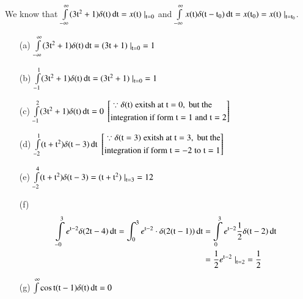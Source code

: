 \begin{solution}
We know that $\int\limits_{-\infty}^{\infty}(3\textrm{t}^{2}+1)\delta(\textrm{t})\operatorname{dt} = x(\textrm{t})\left. \right|_{\textrm{t} =0}$ and $\int\limits_{-\infty}^{\infty} x(\textrm{t}) \delta(\textrm{t}-\textrm{t}_{0})\operatorname{dt} = x(\textrm{t}_{0})=x(\textrm{t})\left. \right|_{\textrm{t} =\textrm{t}_{0}}$.
\begin{itemize}
\item[{\rm(a)}] $\int\limits_{-\infty}^{\infty}(3\textrm{t}^{2}+ 1)\delta(\textrm{t})\operatorname{dt} =(3\textrm{t}+ 1)\left. \right|_{\textrm{t}=0} =1$

\item[{\rm(b)}] $\int\limits_{-1}^{1}(3\textrm{t}^{2}+ 1) \delta(\textrm{t})\operatorname{dt} = (3\textrm{t}^{2} + 1)\left. \right|_{\textrm{t}=0} = 1$

\item[{\rm(c)}] $\int\limits_{-1}^{2} (3\textrm{t}^{2}+1)\delta(\textrm{t})\operatorname{dt}=0$\qquad
$
\left[
\begin{aligned}
& \because \delta(\textrm{t})\; \text{exitsh at}\; \textrm{t}=0,\; \text{but the} \\
& \text{integration if form}\; \textrm{t}=1 \;\text{and}\; \textrm{t}=2
\end{aligned}
 \right]
$

\item[{\rm(d)}] $\int\limits_{-2}^{1} (\textrm{t} + \textrm{t}^{2})\delta(\textrm{t}-3)\operatorname{dt}$\qquad\quad
$
\left[
\begin{aligned}
& \because \delta(\textrm{t}=3)\; \text{exitsh at}\; \textrm{t}=3,\; \text{but the} \\
& \text{integration if form}\; \textrm{t}=-2 \;\text{to}\; \textrm{t}=1
\end{aligned}
 \right]
$

\item[{\rm(e)}] $\int\limits_{-2}^{4} (\textrm{t} + \textrm{t}^{2})\delta(\textrm{t}-3)= (\textrm{t}+ \textrm{t}^{2})\left. \right|_{\textrm{t}=3} =12$

\item [{\rm(f)}]
\begin{equation*}
\begin{split}
\int\limits_{-0}^{3}e^{\textrm{t}-2}\delta(2\textrm{t}-4)\operatorname{dt} = \int_{0}^{3}e^{\textrm{t}-2} \cdot \delta(2(\textrm{t}-1))\operatorname{dt} &= \int\limits_{0}^{3}e^{\textrm{t}-2}\frac{1}{2}\delta(\textrm{t}-2)\operatorname{dt}\\
&=\frac{1}{2}e^{\textrm{t}-2} \left. \right|_{\textrm{t}=2} =\frac{1}{2}
\end{split}
\end{equation*}

\item[{\rm(g)}] $\int\limits^{\infty} \cos\textrm{t}(\textrm{t}-1)\delta(\textrm{t})\operatorname{dt} =0$
\end{itemize}
\end{solution}

